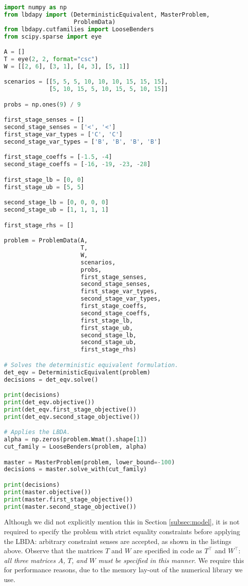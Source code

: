 \documentclass[12pt, english]{article}
\begin{document}
\begin{lstlisting}[caption={Specifying a custom problem in Python.},
                   label={listing:custom_example_python},
                   language={Python}]
import numpy as np
from lbdapy import (DeterministicEquivalent, MasterProblem, 
					ProblemData)
from lbdapy.cutfamilies import LooseBenders
from scipy.sparse import eye

A = []
T = eye(2, 2, format="csc")
W = [[2, 6], [3, 1], [4, 3], [5, 1]]

scenarios = [[5, 5, 5, 10, 10, 10, 15, 15, 15],
             [5, 10, 15, 5, 10, 15, 5, 10, 15]]

probs = np.ones(9) / 9

first_stage_senses = []
second_stage_senses = ['<', '<']
first_stage_var_types = ['C', 'C']
second_stage_var_types = ['B', 'B', 'B', 'B']

first_stage_coeffs = [-1.5, -4]
second_stage_coeffs = [-16, -19, -23, -28]

first_stage_lb = [0, 0]
first_stage_ub = [5, 5]

second_stage_lb = [0, 0, 0, 0]
second_stage_ub = [1, 1, 1, 1]

first_stage_rhs = []

problem = ProblemData(A,
				      T,
					  W,
					  scenarios,
					  probs,
					  first_stage_senses,
					  second_stage_senses,
					  first_stage_var_types,
					  second_stage_var_types,
					  first_stage_coeffs,
					  second_stage_coeffs,
					  first_stage_lb,
					  first_stage_ub,
					  second_stage_lb,
					  second_stage_ub,
					  first_stage_rhs)

# Solves the deterministic equivalent formulation.
det_eqv = DeterministicEquivalent(problem)
decisions = det_eqv.solve()

print(decisions)
print(det_eqv.objective())
print(det_eqv.first_stage_objective())
print(det_eqv.second_stage_objective())

# Applies the LBDA.
alpha = np.zeros(problem.Wmat().shape[1])
cut_family = LooseBenders(problem, alpha)

master = MasterProblem(problem, lower_bound=-100)
decisions = master.solve_with(cut_family)

print(decisions)
print(master.objective())
print(master.first_stage_objective())
print(master.second_stage_objective())
\end{lstlisting}
Although we did not explicitly mention this in Section \ref{subsec:model}, it is not required to specify the problem with strict equality constraints before applying the LBDA: arbitrary constraint senses are accepted, as shown in the listings above. Observe that the matrices $T$ and $W$ are specified in code as $T^\top$ and $W^\top$: \emph{all three matrices $A$, $T$, and $W$ must be specified in this manner}. We require this for performance reasons, due to the memory lay-out of the numerical library we use. 
\end{document}
